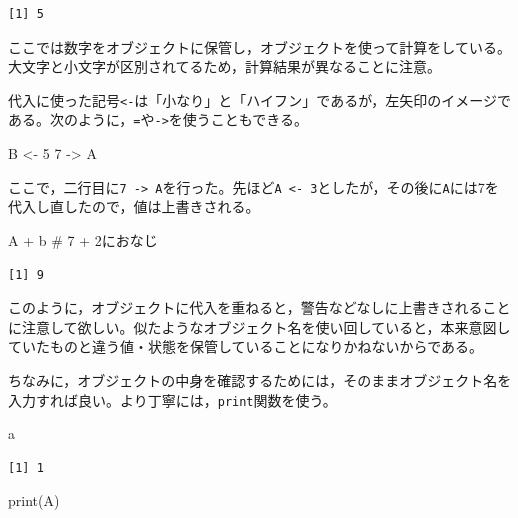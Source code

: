\documentclass[
  a4paper,
]{ltjsbook}
\newenvironment{Shaded}{\begin{snugshade}}{\end{snugshade}}
\newcommand{\CommentTok}[1]{\textcolor[rgb]{0.37,0.37,0.37}{#1}}
\newcommand{\DecValTok}[1]{\textcolor[rgb]{0.68,0.00,0.00}{#1}}
\newcommand{\FunctionTok}[1]{\textcolor[rgb]{0.28,0.35,0.67}{#1}}
\newcommand{\NormalTok}[1]{\textcolor[rgb]{0.00,0.23,0.31}{#1}}
\newcommand{\OtherTok}[1]{\textcolor[rgb]{0.00,0.23,0.31}{#1}}
\newcommand{\SpecialCharTok}[1]{\textcolor[rgb]{0.37,0.37,0.37}{#1}}
\begin{document}
\begin{verbatim}
[1] 5
\end{verbatim}

ここでは数字をオブジェクトに保管し，オブジェクトを使って計算をしている。大文字と小文字が区別されてるため，計算結果が異なることに注意。

代入に使った記号\texttt{\textless{}-}は「小なり」と「ハイフン」であるが，左矢印のイメージである。次のように，\texttt{=}や\texttt{-\textgreater{}}を使うこともできる。

\begin{Shaded}
\begin{Highlighting}[]
\NormalTok{B }\OtherTok{\textless{}{-}} \DecValTok{5}
\DecValTok{7} \OtherTok{{-}\textgreater{}}\NormalTok{ A}
\end{Highlighting}
\end{Shaded}

ここで，二行目に\texttt{7\ -\textgreater{}\ A}を行った。先ほど\texttt{A\ \textless{}-\ 3}としたが，その後に\texttt{A}には7を代入し直したので，値は上書きされる。

\begin{Shaded}
\begin{Highlighting}[]
\NormalTok{A }\SpecialCharTok{+}\NormalTok{ b }\CommentTok{\# 7 + 2におなじ}
\end{Highlighting}
\end{Shaded}

\begin{verbatim}
[1] 9
\end{verbatim}

このように，オブジェクトに代入を重ねると，警告などなしに上書きされることに注意して欲しい。似たようなオブジェクト名を使い回していると，本来意図していたものと違う値・状態を保管していることになりかねないからである。

ちなみに，オブジェクトの中身を確認するためには，そのままオブジェクト名を入力すれば良い。より丁寧には，\texttt{print}関数を使う。

\begin{Shaded}
\begin{Highlighting}[]
\NormalTok{a}
\end{Highlighting}
\end{Shaded}

\begin{verbatim}
[1] 1
\end{verbatim}

\begin{Shaded}
\begin{Highlighting}[]
\FunctionTok{print}\NormalTok{(A)}
\end{Highlighting}
\end{Shaded}
\end{document}
